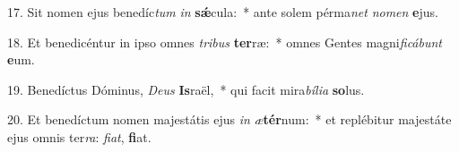 17. Sit nomen ejus benedíc\textit{tum} \textit{in} \textbf{sǽ}cula:~*  ante solem pérma\textit{net} \textit{no}\textit{men} \textbf{e}jus.\

18. Et benedicéntur in ipso omnes \textit{tri}\textit{bus} \textbf{ter}ræ:~*  omnes Gentes magni\textit{fi}\textit{cá}\textit{bunt} \textbf{e}um.\

19. Benedíctus Dóminus, \textit{De}\textit{us} \textbf{Is}raël,~*  qui facit mira\textit{bí}\textit{li}\textit{a} \textbf{so}lus.\

20. Et benedíctum nomen majestátis ejus \textit{in} \textit{æ}\textbf{tér}num:~*  et replébitur majestáte ejus omnis ter\textit{ra}: \textit{fi}\textit{at}, \textbf{fi}at.\

